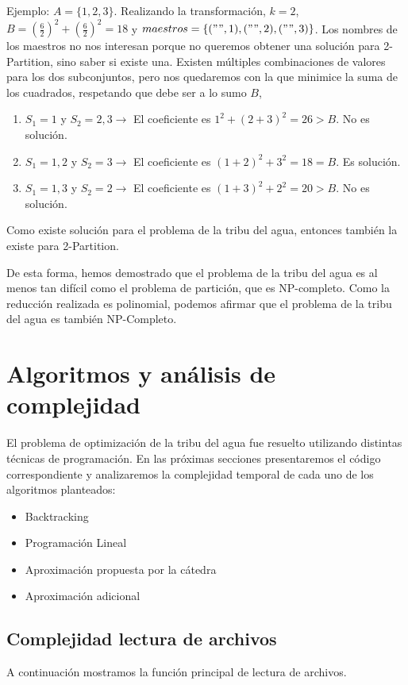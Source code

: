 \documentclass{article}
\begin{document}
Ejemplo: $A = \{1, 2, 3\}$. Realizando la transformación, $k = 2$, $B = (\frac{6}{2})^2 + (\frac{6}{2})^2 = 18$ y $maestros = \{("", 1), ("", 2), ("", 3)\}$. Los nombres de los maestros no nos interesan porque no queremos obtener una solución para 2-Partition, sino saber si existe una. Existen múltiples combinaciones de valores para los dos subconjuntos, pero nos quedaremos con la que minimice la suma de los cuadrados, respetando que debe ser a lo sumo $B$,
\begin{enumerate}
    \item $S_1 = {1}$ y $S_2 = {2, 3} \rightarrow$ El coeficiente es $1^2 + (2 + 3)^2 = 26 > B$. No es solución.
    \item $S_1 = {1, 2}$ y $S_2 = {3} \rightarrow$ El coeficiente es $(1 + 2)^2 + 3^2 = 18 = B$. Es solución.
    \item $S_1 = {1, 3}$ y $S_2 = {2} \rightarrow$ El coeficiente es $(1 + 3)^2 + 2^2 = 20 > B$. No es solución.    
\end{enumerate}
Como existe solución para el problema de la tribu del agua, entonces también la existe para 2-Partition.

De esta forma, hemos demostrado que el problema de la tribu del agua es al menos tan difícil como el problema de partición, que es NP-completo. Como la reducción realizada es polinomial, podemos afirmar que el problema de la tribu del agua es también NP-Completo.

\section{Algoritmos y análisis de complejidad}

El problema de optimización de la tribu del agua fue resuelto utilizando distintas técnicas de programación. En las próximas secciones presentaremos el código correspondiente y analizaremos la complejidad temporal de cada uno de los algoritmos planteados:
\begin{itemize}
    \item Backtracking
    \item Programación Lineal
    \item Aproximación propuesta por la cátedra
    \item Aproximación adicional
\end{itemize}

\subsection{Complejidad lectura de archivos}
A continuación mostramos la función principal de lectura de archivos. 
\inputminted[linenos, firstline=9, lastline=24]{python}{codigo/archivos.py}
\end{document}
